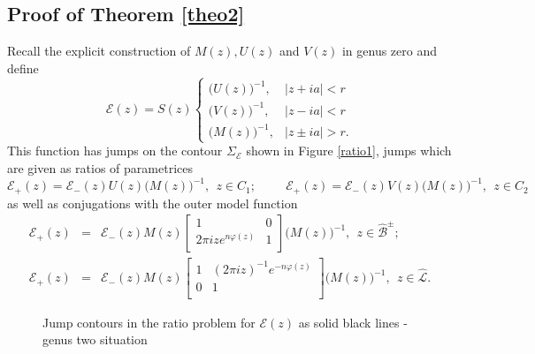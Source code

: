 \documentclass[10pt,oneside,reqno]{amsart}
\numberwithin{equation}{section}
\begin{document}
\subsection{Proof of Theorem \ref{theo2}} Recall the explicit construction of $M(z),U(z)$ and $V(z)$ in genus zero and define
\begin{equation}\label{ratio}
  {\mathcal E}(z) = S(z)\begin{cases}
                          \big(U(z)\big)^{-1},&|z+ia|<r\\
\big(V(z)\big)^{-1},&|z-ia|<r\\
\big(M(z)\big)^{-1},&|z\pm ia|>r.
                         \end{cases}
\end{equation}
This function has jumps on the contour $\Sigma_{\mathcal E}$ shown in Figure \ref{ratio1}, jumps which are given as ratios of parametrices 
\begin{equation*}
  {\mathcal E}_+(z)={\mathcal E}_-(z)U(z)\big(M(z)\big)^{-1},\ \ z\in C_1;\hspace{1cm}{\mathcal E}_+(z)={\mathcal E}_-(z)V(z)\big(M(z)\big)^{-1},\ \ z\in C_2
\end{equation*}
as well as conjugations with the outer model function
\begin{eqnarray*}
  {\mathcal E}_+(z)&=&{\mathcal E}_-(z)M(z)\begin{bmatrix}
                                      1 & 0\\
2\pi iz e^{n\varphi(z)}& 1\\
                                     \end{bmatrix}\big(M(z)\big)^{-1},\ \ z\in\hat{\mathcal{B}}^{\pm};\\
 {\mathcal E}_+(z)&=&{\mathcal E}_-(z)M(z)\begin{bmatrix}
1 & (2\pi iz)^{-1}e^{-n\varphi(z)}\\
0 & 1\\
\end{bmatrix}\big(M(z)\big)^{-1},\ \ z\in\hat{\mathcal{L}}.
\end{eqnarray*}

\begin{figure}[tbh]
\begin{center}
\resizebox{0.4\textwidth}{!}{}\hspace{2cm}\resizebox{0.4\textwidth}{!}{}
\begin{minipage}{0.49\textwidth}
\caption{Jump contours in the ratio problem for ${\mathcal E}(z)$ as solid black lines - genus zero situation}
\label{ratio1}
\end{minipage}
\begin{minipage}{0.49\textwidth}
\caption{Jump contours in the ratio problem for ${\mathcal E}(z)$ as solid black lines - genus two situation}
\label{ratio2}
\end{minipage}
\end{center}
\end{figure}
\end{document}

